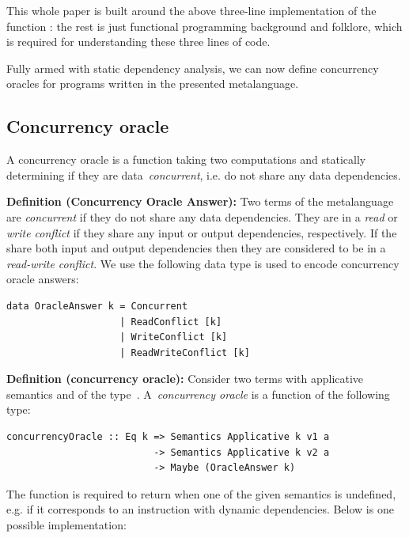 This whole paper is built around the above three-line implementation of the
function : the rest is just functional programming background
and folklore, which is required for understanding these three lines of code.

Fully armed with static dependency analysis, we can now define concurrency
oracles for programs written in the presented metalanguage.

\subsection{Concurrency oracle}
A concurrency oracle is a function taking two computations and statically
determining if they are data~\emph{concurrent}, i.e. do not share any
data dependencies.


\textbf{Definition (Concurrency Oracle Answer):\label{def:concurrency-status}}
Two terms of the metalanguage are \emph{concurrent} if they do not share any
data dependencies. They are in a \emph{read} or \emph{write conflict} if they
share any input or output dependencies, respectively. If the share both input
and output dependencies then they are considered to be in a \emph{read-write
conflict}. We use the following data type is used to encode concurrency oracle
answers:

\begin{verbatim}
data OracleAnswer k = Concurrent
                    | ReadConflict [k]
                    | WriteConflict [k]
                    | ReadWriteConflict [k]
\end{verbatim}

\textbf{Definition (concurrency oracle):\label{def:oracle}}
Consider two terms with applicative semantics  and  of the
type~. A~\emph{concurrency oracle} is a
function of the following type:
\begin{verbatim}
concurrencyOracle :: Eq k => Semantics Applicative k v1 a
                          -> Semantics Applicative k v2 a
                          -> Maybe (OracleAnswer k)
\end{verbatim}

\noindent
The function is required to return  when one of the given semantics
is undefined, e.g. if it corresponds to an instruction with dynamic dependencies.
Below is one possible implementation:

